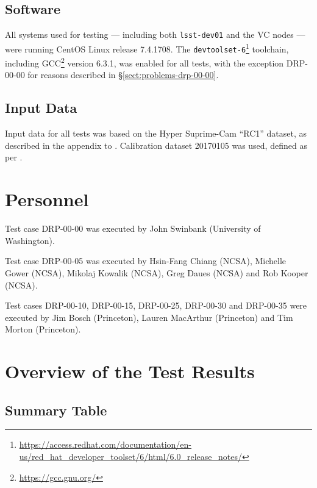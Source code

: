\documentclass[DM,lsstdraft,STR,toc]{lsstdoc}
\begin{document}
\subsection{Software}
\label{sect:swconf}

All systems used for testing --- including both \texttt{lsst-dev01} and the VC nodes --- were running CentOS Linux release 7.4.1708.
The \texttt{devtoolset-6}\footnote{\url{https://access.redhat.com/documentation/en-us/red_hat_developer_toolset/6/html/6.0_release_notes/}} toolchain, including GCC\footnote{\url{https://gcc.gnu.org/}} version 6.3.1, was enabled for all tests, with the exception DRP-00-00 for reasons described in \S\ref{sect:problems-drp-00-00}.

\subsection{Input Data}
\label{sect:inputdata}

Input data for all tests was based on the Hyper Suprime-Cam “RC1” dataset, as described in the appendix to .
Calibration dataset 20170105 was used, defined as per .

\section{Personnel}
\label{sect:personnel}

Test case DRP-00-00 was executed by John Swinbank (University of Washington).

Test case DRP-00-05 was executed by Hsin-Fang Chiang (NCSA), Michelle Gower (NCSA), Mikolaj Kowalik (NCSA), Greg Daues (NCSA) and Rob Kooper (NCSA).

Test cases DRP-00-10, DRP-00-15, DRP-00-25, DRP-00-30 and DRP-00-35 were executed by Jim Bosch (Princeton), Lauren MacArthur (Princeton) and Tim Morton (Princeton).

\newpage

\section{Overview of the Test Results}
\label{sect:overview}

\subsection{Summary Table}
\label{sect:summarytable}
\end{document}
